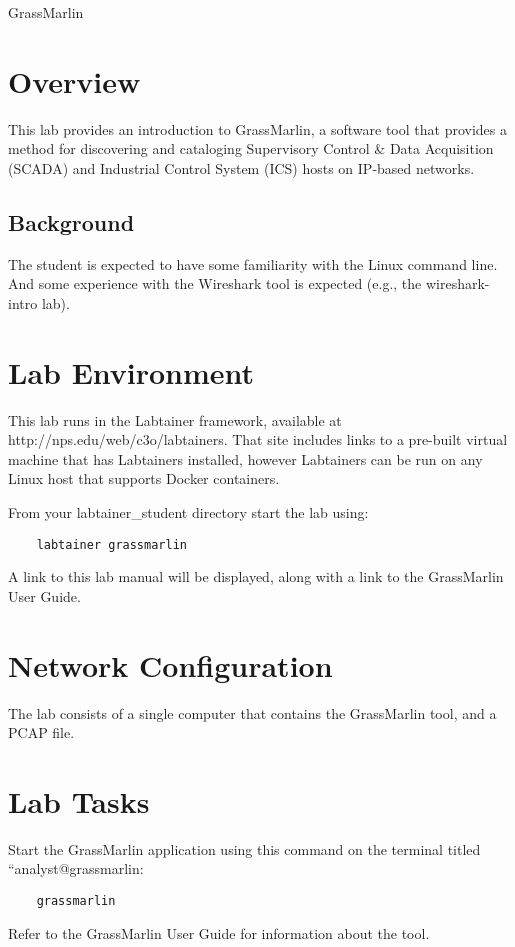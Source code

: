 


\begin{center}
{\LARGE GrassMarlin}
\vspace{0.1in}\\
\end{center}

\section{Overview}
This lab provides an introduction to GrassMarlin, a software tool that provides a method for discovering and cataloging
Supervisory Control \& Data Acquisition (SCADA) and Industrial Control System (ICS) hosts on IP-based
networks.

\subsection {Background}
The student is expected to have some familiarity with the Linux command line.
And some experience with the Wireshark tool is expected (e.g., the wireshark-intro lab).

\section{Lab Environment}
This lab runs in the Labtainer framework,
available at http://nps.edu/web/c3o/labtainers.
That site includes links to a pre-built virtual machine
that has Labtainers installed, however Labtainers can
be run on any Linux host that supports Docker containers.

From your labtainer_student directory start the lab using:
\begin{verbatim}
    labtainer grassmarlin
\end{verbatim}
\noindent A link to this lab manual will be displayed, along with a link to the
GrassMarlin User Guide.


\section{Network Configuration}
The lab consists of a single computer that contains the GrassMarlin tool, and a PCAP file.

\section{Lab Tasks}
Start the GrassMarlin application using this command on the terminal titled ``analyst@grassmarlin:
\begin{verbatim}
    grassmarlin
\end{verbatim}
\noindent Refer to the GrassMarlin User Guide for information about the tool.

